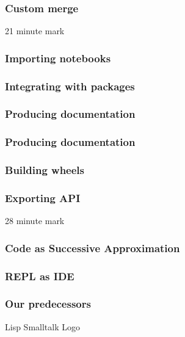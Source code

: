 \begin{frame}
\frametitle{Custom merge}
\end{frame}

21 minute mark

\begin{frame}
\frametitle{Importing notebooks}
\end{frame}

\begin{frame}
\frametitle{Integrating with packages}
\end{frame}

\begin{frame}
\frametitle{Producing documentation}
\end{frame}

\begin{frame}
\frametitle{Producing documentation}
\end{frame}

\begin{frame}
\frametitle{Building wheels}
\end{frame}

\begin{frame}
\frametitle{Exporting API}
\end{frame}

28 minute mark

\begin{frame}
\frametitle{Code as Successive Approximation}
\end{frame}

\begin{frame}
\frametitle{REPL as IDE}
\end{frame}

\begin{frame}
\frametitle{Our predecessors}
Lisp
Smalltalk
Logo
\end{frame}


